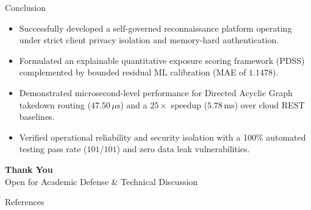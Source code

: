 \documentclass[aspectratio=169,10pt]{beamer}
\begin{document}
\begin{frame}{Conclusion}
  \normalsize
  \begin{itemize}\setlength{\itemsep}{0.40cm}
    \item Successfully developed a self-governed reconnaissance platform operating under strict client privacy isolation and memory-hard authentication.
    \item Formulated an explainable quantitative exposure scoring framework (PDSS) complemented by bounded residual ML calibration (MAE of $1.1478$).
    \item Demonstrated microsecond-level performance for Directed Acyclic Graph takedown routing ($47.50\,\mu\text{s}$) and a $25\times$ speedup ($5.78\,\text{ms}$) over cloud REST baselines.
    \item Verified operational reliability and security isolation with a 100\% automated testing pass rate ($101/101$) and zero data leak vulnerabilities.
  \end{itemize}
\end{frame}


{
\begin{frame}
  \begin{center}
    \huge
    \textbf{Thank You}\\
    \vspace{0.8cm}
    \Large Open for Academic Defense \& Technical Discussion
  \end{center}
\end{frame}
}

\begin{frame}[allowframebreaks]{References}
  \tiny
  \printbibliography[heading=none]
\end{frame}
\end{document}

